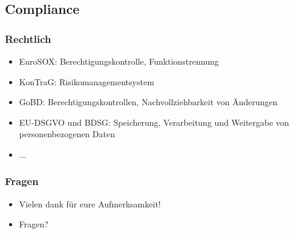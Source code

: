 \documentclass[11pt]{beamer}
\begin{document}
\subsection{Compliance}
\begin{frame}
  \frametitle{Rechtlich}
  \begin{itemize}
    \item EuroSOX: Berechtigungskontrolle, Funktionstrennung
    \item KonTraG: Risikomanagementsystem
    \item GoBD: Berechtigungskontrollen, Nachvollziehbarkeit von Änderungen
    \item EU-DSGVO und BDSG: Speicherung, Verarbeitung und Weitergabe von personenbezogenen Daten
    \item ...
  \end{itemize}
\end{frame}

\begin{frame}
  \frametitle{Fragen}
  \begin{itemize}
    \item Vielen dank für eure Aufmerksamkeit!
    \item Fragen?
  \end{itemize}
\end{frame}
\end{document}
